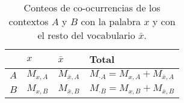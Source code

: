 

\begin{table}[h]
  \centering
  \begin{tabular}{l|lll}
    \hline
        & $x$       & $\bar{x}$       & \textbf{Total}                          \\ \hline
    $A$ & $M_{x,A}$ & $M_{\bar{x},A}$ & $M_{\cdot A} = M_{x,A} + M_{\bar{x},A}$ \\
    $B$ & $M_{x,B}$ & $M_{\bar{x},B}$ & $M_{\cdot B} = M_{x,B} + M_{\bar{x},B}$ \\ \hline
  \end{tabular}
  \caption[Conteos de co-ocurrencias de los contextos $A$ y $B$ con la palabra $x$ y con el resto del vocabulario $\bar{x}$]{
    Conteos de co-ocurrencias de los contextos $A$ y $B$ con la palabra $x$ y con el resto del vocabulario $\bar{x}$.
  }
  \label{tab:contingency}
\end{table}




